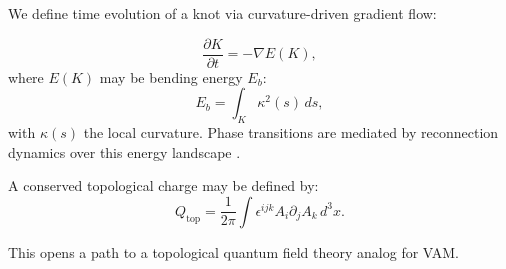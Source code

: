 We define time evolution of a knot via curvature-driven gradient flow:

\begin{equation}
    \frac{\partial K}{\partial t} = - \nabla E(K),
\end{equation}
where $E(K)$ may be bending energy $E_b$:
\begin{equation}
    E_b = \int_K \kappa^2(s) \, ds,
\end{equation}
with $\kappa(s)$ the local curvature. Phase transitions are mediated by reconnection dynamics over this energy landscape \cite{moffatt1990dynamics}.

A conserved topological charge may be defined by:
\begin{equation}
    Q_\text{top} = \frac{1}{2\pi} \int \epsilon^{ijk} A_i \partial_j A_k \, d^3x.
\end{equation}

This opens a path to a topological quantum field theory analog for VAM.